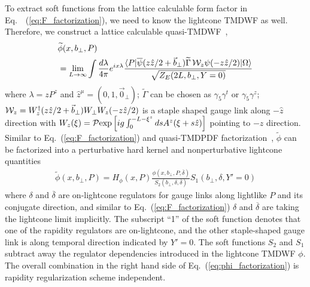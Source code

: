 \documentclass[twocolumn,aps,preprintnumbers,prd,superscriptaddress,10pt]{revtex4-1}
\begin{document}
To extract soft functions from the lattice calculable form factor in Eq.~~(\ref{eq:F_factorization}),
we need to know the lightcone TMDWF as well.
%
Therefore, we construct a lattice calculable quasi-TMDWF~\cite{Ji:2013dva},
\begin{align}\label{eq:quasi-TMDWF}
&\widetilde \phi(x,b_\perp,P)\\
&=\lim_{L\to\infty}\int\frac{d\lambda}{4\pi}e^{ix \lambda }\frac{\langle P|\overline\psi(z \hat z/2 +\vec b_\perp)\widetilde\Gamma\,{\cal W}_z\psi(-z \hat z/2)|\Omega\rangle}{\sqrt{Z_E(2L,b_\perp,Y=0)}}\nonumber
\end{align}
where $\lambda=zP^z$ and $\hat z^{\mu}=(0,1,\vec{0}_\perp)$;
$\widetilde\Gamma$ can be chosen as $\gamma_5\gamma^t$ or $\gamma_5\gamma^z$;
${\cal W}_z=W_z^{\dagger}(z \hat z/2 +\vec b_\perp)W_\perp W_z(-z \hat z/2)$ is a staple shaped gauge link along $-\hat z$ direction with $W_z(\xi)={\cal P}{\rm exp}\left[ig\int^{-L-\xi^z}_{0} ds A^z(\xi+s\hat z )\right]$ pointing to $-z$ direction.
%
Similar to Eq.~(\ref{eq:F_factorization}) and quasi-TMDPDF factorization~\cite{Ji:2019ewn}, $\widetilde \phi$ can be factorized into
a perturbative hard kernel and nonperturbative lightcone quantities~\cite{future}
\begin{align}\label{eq:phi_factorization}
\widetilde \phi(x,b_\perp,P)=H_\phi(x,P)\frac{\phi(x,b_\perp,P,\overline \delta)}{S_2(b_\perp,\delta,\overline \delta)}S_1(b_\perp,\delta,Y'=0)
\end{align}
where $\delta$ and $\overline \delta$ are on-lightcone regulators for gauge links along lightlike $P$ and its conjugate direction, and similar to Eq.~(\ref{eq:F_factorization}) $\delta$ and $\overline \delta$ are taking the lightcone limit implicitly.
%
The subscript ``1'' of the soft function denotes that one of the rapidity regulators are on-lightcone, and the other staple-shaped gauge link is along temporal direction indicated by $Y'=0$.
%
The soft functions $S_2$ and $S_1$
subtract away the regulator dependencies introduced in the lightcone TMDWF $\phi$.
%
The overall combination in the right hand side of Eq.~(\ref{eq:phi_factorization}) is rapidity
regularization scheme independent.
\end{document}
